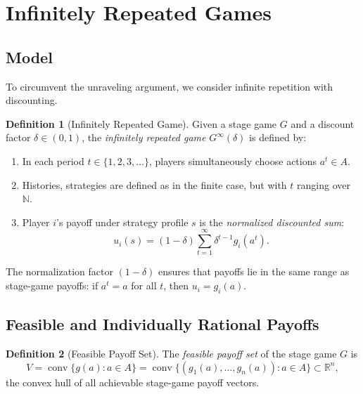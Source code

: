 \documentclass[11pt,a4paper]{article}
\theoremstyle{definition}
\newtheorem{definition}{Definition}[section]
\theoremstyle{plain}
\theoremstyle{remark}
\newcommand{\R}{\mathbb{R}}
\newcommand{\N}{\mathbb{N}}
\DeclareMathOperator{\conv}{conv}
\begin{document}
\section{Infinitely Repeated Games}
\label{sec:infinitely-repeated}

\subsection{Model}

To circumvent the unraveling argument, we consider infinite repetition with discounting.

\begin{definition}[Infinitely Repeated Game]
\label{def:infinitely-repeated}
Given a stage game $G$ and a discount factor $\delta \in (0,1)$, the \emph{infinitely
repeated game} $G^\infty(\delta)$ is defined by:
\begin{enumerate}[label=(\alph*)]
    \item In each period $t \in \{1, 2, 3, \ldots\}$, players simultaneously choose
    actions $a^t \in A$.
    \item Histories, strategies are defined as in the finite case, but with $t$ ranging
    over $\N$.
    \item Player $i$'s payoff under strategy profile $s$ is the \emph{normalized discounted
    sum}:
    \[
        u_i(s) = (1 - \delta) \sum_{t=1}^{\infty} \delta^{t-1} g_i(a^t).
    \]
\end{enumerate}
The normalization factor $(1-\delta)$ ensures that payoffs lie in the same range as
stage-game payoffs: if $a^t = a$ for all $t$, then $u_i = g_i(a)$.
\end{definition}

\subsection{Feasible and Individually Rational Payoffs}

\begin{definition}[Feasible Payoff Set]
\label{def:feasible-payoffs}
The \emph{feasible payoff set} of the stage game $G$ is
\[
    V = \conv\{g(a) : a \in A\} = \conv\{(g_1(a), \ldots, g_n(a)) : a \in A\} \subset \R^n,
\]
the convex hull of all achievable stage-game payoff vectors.
\end{definition}
\end{document}
